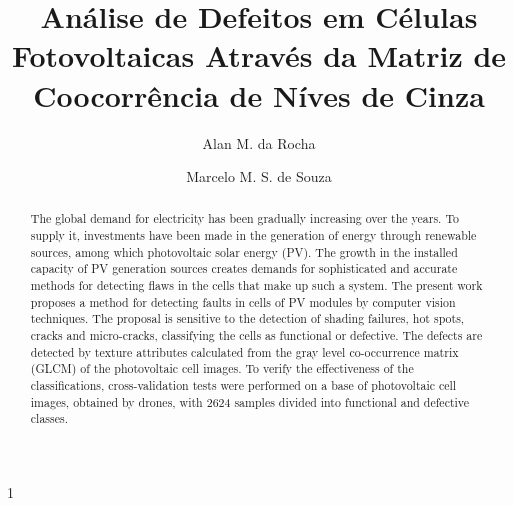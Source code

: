 \documentclass[a4paper]{ifacconf}
\def\portugues{1}
\def\portugues{0}
\begin{document}
	
\if\portugues1

% 
	
\begin{frontmatter}


\title{Análise de Defeitos em Células Fotovoltaicas Através da Matriz de Coocorrência de Níves de Cinza} 

\author[First]{Alan M. da Rocha} 
\author[Second]{Marcelo M. S. de Souza} 

\address[First]{Universidade Federal do Ceará, Campus Mucambinho, Sobral, CE, Brasil (e-mail: eng.alanmarquesrocha@gmail.com).}
\address[Second]{Universidade Federal do Ceará, Campus Mucambinho, Sobral, CE, Brasil (e-mail: marcelo.mssouza@gmail.com)}


\renewcommand{\abstractname}{{\bf Abstract:~}}
\begin{abstract} %
The global demand for electricity has been gradually increasing over the 
years. To supply it, investments have been made in the generation of energy 
through renewable sources, among which photovoltaic solar energy (PV). The 
growth in the installed capacity of PV generation sources creates demands 
for sophisticated and accurate methods for detecting flaws in the cells that make up such a system. The present work proposes a method for detecting 
faults in cells of PV modules by computer vision techniques. The proposal is sensitive to the detection of shading failures, hot spots, cracks and 
micro-cracks, classifying the cells as functional or defective. The defects 
are detected by texture attributes calculated from the gray level 
co-occurrence matrix (GLCM) of the photovoltaic cell images. To verify the 
effectiveness of the classifications, cross-validation tests were performed 
on a base of photovoltaic cell images, obtained by drones, with 2624 samples divided into functional and defective classes.


\end{abstract}
\end{frontmatter}
\end{document}
